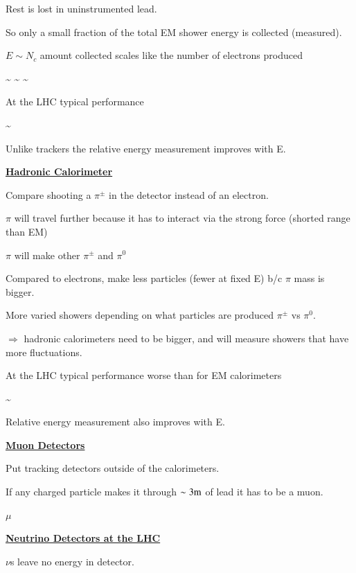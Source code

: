 {\begin{minipage}{0.7\textwidth}
Rest is lost in uninstrumented lead.
\end{minipage}

So only a small fraction of the total EM shower energy is collected (measured).

$E \sim N_c$ amount collected scales like the number of electrons produced

\be
{} \sim {} \sim {} \sim {}
\ee

At the LHC typical performance

\be
{} \sim  {}
\ee

Unlike trackers the relative energy measurement improves with E.

\clearpage
\textbf{\underline{Hadronic Calorimeter}}

Compare shooting a $\pi^\pm$ in the detector instead of an electron.

\bi
\item[-]$\pi$ will travel further because it has to interact via the strong force (shorted range than EM)
\item[-]$\pi$ will make other $\pi^\pm$ and $\pi^0$
\item[-]Compared to electrons, make less particles (fewer at fixed E) b/c $\pi$ mass is bigger.
\item[-]More varied showers depending on what particles are produced $\pi^\pm$ vs $\pi^0$.
\ei

$\Rightarrow$ hadronic calorimeters need to be bigger, and will measure showers that have more fluctuations.

At the LHC typical performance worse than for EM calorimeters

\be
{} \sim  {}
\ee

Relative energy measurement also improves with E.


\textbf{\underline{Muon Detectors}}

Put tracking detectors outside of the calorimeters. 

If any charged particle makes it through $\sim3\textrm{m}$ of lead it has to be a muon. 

$\mu$ 

\textbf{\underline{Neutrino Detectors at the LHC}}

$\nu$s leave no energy in detector.  

}
